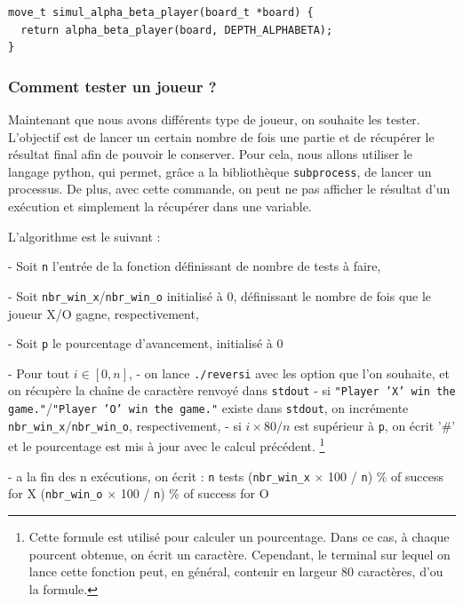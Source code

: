 \documentclass{report}
\begin{document}
\begin{lstlisting}
move_t simul_alpha_beta_player(board_t *board) {
  return alpha_beta_player(board, DEPTH_ALPHABETA);
}
\end{lstlisting}

\subsubsection{Comment tester un joueur ?}

Maintenant que nous avons différents type de joueur, on souhaite les tester. L'objectif est de lancer un certain nombre de fois une partie et de récupérer le résultat final afin de pouvoir le conserver.
Pour cela, nous allons utiliser le langage python, qui permet, grâce a la bibliothèque \texttt{subprocess}, de lancer un processus. De plus, avec cette commande, on peut ne pas afficher le résultat d'un exécution et simplement la récupérer dans une variable.\newline

L'algorithme est le suivant :\newline

- Soit \texttt{n} l'entrée de la fonction définissant de nombre de tests à faire,

- Soit \texttt{nbr\_win\_x}/\texttt{nbr\_win\_o} initialisé à 0, définissant le nombre de fois que le joueur X/O gagne, respectivement,

- Soit \texttt{p} le pourcentage d'avancement, initialisé à 0

- Pour tout $i\in[0,n]$,
\tabto{1 cm} - on lance \texttt{./reversi} avec les option que l'on souhaite, et on récupère la chaîne de caractère renvoyé dans \texttt{stdout}
\tabto{1 cm} - si \texttt{"Player 'X' win the game."}/\texttt{"Player 'O' win the game."} existe dans \texttt{stdout}, on incrémente \texttt{nbr\_win\_x}/\texttt{nbr\_win\_o}, respectivement,
\tabto{1 cm} - si $i\times80/n$ est supérieur à \texttt{p}, on écrit '\#' et le pourcentage est mis à jour avec le calcul précédent. \footnote{Cette formule est utilisé pour calculer un pourcentage. Dans ce cas, à chaque pourcent obtenue, on écrit un caractère. Cependant, le terminal sur lequel on lance cette fonction peut, en général, contenir en largeur 80 caractères, d'ou la formule.}

- a la fin des n exécutions, on écrit : \newline
\texttt{n} tests\newline
(\texttt{nbr\_win\_x} $\times$ 100 / \texttt{n}) \% of success for X\newline
(\texttt{nbr\_win\_o} $\times$ 100 / \texttt{n}) \% of success for O\newline
\end{document}
